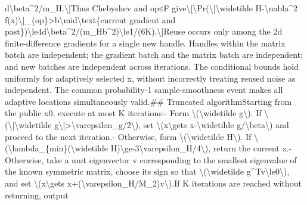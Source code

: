 \documentclass[10pt,a4paper]{article}
\begin{document}
d\textbackslash{}beta\textasciicircum{}2/\allowbreak{}m\_\allowbreak{}H.\newline{}\textbackslash{}]\newline{}Thus Chebyshev and op{\AtlasUnicodeSymbols ≤}\allowbreak{}F give\newline{}\textbackslash{}[\newline{}\textbackslash{}Pr(\textbackslash{}|\textbackslash{}widetilde H-\textbackslash{}nabla\textasciicircum{}2 f(x)\textbackslash{}|\_\allowbreak{}\{op\}>b\textbackslash{}mid\textbackslash{}text\{current gradient and past\})\newline{}\textbackslash{}le4d\textbackslash{}beta\textasciicircum{}2/\allowbreak{}(m\_\allowbreak{}Hb\textasciicircum{}2)\textbackslash{}le1/\allowbreak{}(6K).\newline{}\textbackslash{}]\newline{}\newline{}Reuse occurs only among the 2d finite-difference gradients for a single new handle. Handles within the matrix batch are independent;\allowbreak{} the gradient batch and the matrix batch are independent;\allowbreak{} and new batches are independent across iterations. The conditional bounds hold uniformly for adaptively selected x,\allowbreak{} without incorrectly treating reused noise as independent. The common probability-1 sample-smoothness event makes all adaptive locations simultaneously valid.\newline{}\newline{}\#\# Truncated algorithm\newline{}\newline{}Starting from the public x0,\allowbreak{} execute at most K iterations:\allowbreak{}\newline{}\newline{}- Form \textbackslash{}(\textbackslash{}widetilde g\textbackslash{}). If \textbackslash{}(\textbackslash{}|\textbackslash{}widetilde g\textbackslash{}|>\textbackslash{}varepsilon\_\allowbreak{}g/\allowbreak{}2\textbackslash{}),\allowbreak{} set \textbackslash{}(x\textbackslash{}gets x-\textbackslash{}widetilde g/\allowbreak{}\textbackslash{}beta\textbackslash{}) and proceed to the next iteration.\newline{}- Otherwise,\allowbreak{} form \textbackslash{}(\textbackslash{}widetilde H\textbackslash{}). If \textbackslash{}(\textbackslash{}lambda\_\allowbreak{}\{min\}(\textbackslash{}widetilde H)\textbackslash{}ge-3\textbackslash{}varepsilon\_\allowbreak{}H/\allowbreak{}4\textbackslash{}),\allowbreak{} return the current x.\newline{}- Otherwise,\allowbreak{} take a unit eigenvector v corresponding to the smallest eigenvalue of the known symmetric matrix,\allowbreak{} choose its sign so that \textbackslash{}(\textbackslash{}widetilde g\textasciicircum{}Tv\textbackslash{}le0\textbackslash{}),\allowbreak{} and set \textbackslash{}(x\textbackslash{}gets x+(\textbackslash{}varepsilon\_\allowbreak{}H/\allowbreak{}M\_\allowbreak{}2)v\textbackslash{}).\newline{}\newline{}If K iterations are reached without returning,\allowbreak{} output 
\end{document}
